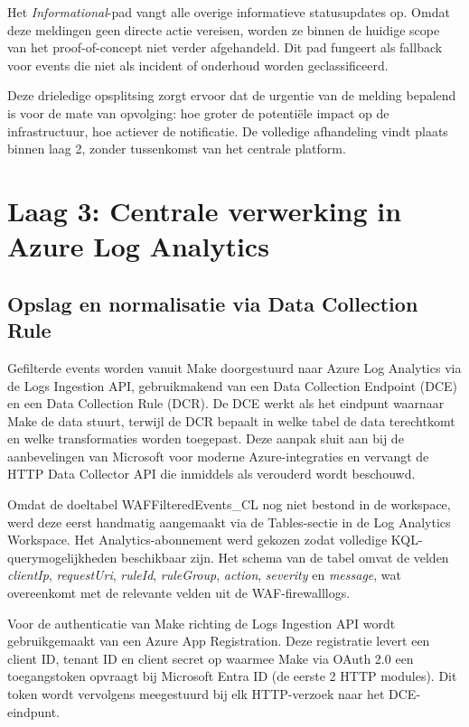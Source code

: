 Het \textit{Informational}-pad vangt alle overige informatieve statusupdates op. Omdat deze meldingen geen directe actie vereisen, worden ze binnen de huidige scope van het proof-of-concept niet verder afgehandeld. Dit pad fungeert als fallback voor events die niet als incident of onderhoud worden geclassificeerd.

Deze drieledige opsplitsing zorgt ervoor dat de urgentie van de melding bepalend is voor de mate van opvolging: hoe groter de potentiële impact op de infrastructuur, hoe actiever de notificatie. De volledige afhandeling vindt plaats binnen laag 2, zonder tussenkomst van het centrale platform.



\section{Laag 3: Centrale verwerking in Azure Log Analytics}
\subsection{Opslag en normalisatie via Data Collection Rule}
Gefilterde events worden vanuit Make doorgestuurd naar Azure Log Analytics via de Logs Ingestion API, gebruikmakend van een Data Collection Endpoint (DCE) en een Data Collection Rule (DCR). De DCE werkt als het eindpunt waarnaar Make de data stuurt, terwijl de DCR bepaalt in welke tabel de data terechtkomt en welke transformaties worden toegepast. Deze aanpak sluit aan bij de aanbevelingen van Microsoft voor moderne Azure-integraties en vervangt de HTTP Data Collector API die inmiddels als verouderd wordt beschouwd.

Omdat de doeltabel WAFFilteredEvents\_CL nog niet bestond in de workspace, werd deze eerst handmatig aangemaakt via de Tables-sectie in de Log Analytics Workspace. Het Analytics-abonnement werd gekozen zodat volledige KQL-querymogelijkheden beschikbaar zijn. Het schema van de tabel omvat de velden \textit{clientIp}, \textit{requestUri}, \textit{ruleId}, \textit{ruleGroup}, \textit{action}, \textit{severity} en \textit{message}, wat overeenkomt met de relevante velden uit de WAF-firewalllogs.

Voor de authenticatie van Make richting de Logs Ingestion API wordt gebruikgemaakt van een Azure App Registration. Deze registratie levert een client ID, tenant ID en client secret op waarmee Make via OAuth 2.0 een toegangstoken opvraagt bij Microsoft Entra ID (de eerste 2 HTTP modules). Dit token wordt vervolgens meegestuurd bij elk HTTP-verzoek naar het DCE-eindpunt.

